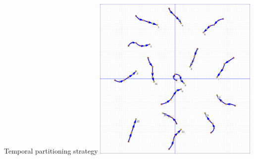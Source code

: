 \documentclass{beamer}
\begin{document}
\begin{frame}{Temporal partitioning strategy}
    \centering
    \includegraphics[width=0.6\textwidth]{figures/partitions}
\end{frame}
\end{document}

